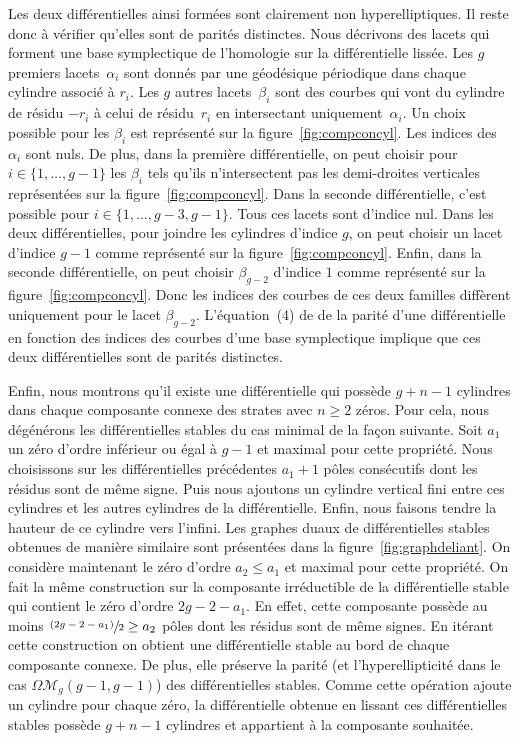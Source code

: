 \documentclass[11pt]{article}
\numberwithin{equation}{section}\renewcommand{\proofname}{Démonstration}
\let\mathcal\mathscr
\newcommand{\psfrac}[2]{\sfrac{(#1)}{#2}}
\newcommand{\omoduli}[1][g]{{\Omega\mathcal M}_{\!#1}}
\theoremstyle{definition}
\begin{document}
Les deux différentielles ainsi formées sont clairement non hyperelliptiques. Il reste donc à vérifier qu'elles sont de parités distinctes. Nous décrivons des lacets qui forment une base symplectique de l'homologie sur la différentielle lissée. Les $g$ premiers lacets~$\alpha_{i}$ sont donnés par une géodésique périodique dans chaque cylindre associé à $r_{i}$. Les $g$ autres lacets~$\beta_{i}$ sont des courbes qui vont du cylindre de résidu $-r_{i}$ à celui de résidu~$r_{i}$ en intersectant uniquement~$\alpha_{i}$. Un choix possible pour les $\beta_{i}$ est représenté sur la figure~\ref{fig:compconcyl}. Les indices des~$\alpha_{i}$ sont nuls. De plus, dans la première différentielle, on peut choisir pour $i\in\{1,\dots,g-1\}$ les $\beta_{i}$ tels qu'ils n'intersectent pas les demi-droites verticales représentées sur la figure~\ref{fig:compconcyl}. Dans la seconde différentielle, c'est possible pour $i\in\{ 1,\dots,g-3,g-1 \}$. Tous ces lacets sont d'indice nul. Dans les deux différentielles, pour joindre les cylindres d'indice $g$, on peut choisir un lacet d'indice $g-1$ comme représenté sur la figure~\ref{fig:compconcyl}. Enfin, dans la seconde différentielle, on peut choisir $\beta_{g-2}$ d'indice $1$ comme représenté sur la figure~\ref{fig:compconcyl}. Donc les indices des courbes de ces deux familles diffèrent uniquement pour le lacet $\beta_{g-2}$. L'équation~(4) de \cite{kozo} de la parité d'une différentielle en fonction des indices des courbes d'une base symplectique implique que ces deux différentielles sont de parités distinctes.

Enfin, nous montrons qu'il existe une différentielle qui possède $g+n-1$ cylindres dans chaque composante connexe des strates avec $n\geq2$ zéros. Pour cela, nous dégénérons les différentielles stables du cas minimal de la façon suivante. Soit $a_{1}$ un zéro d'ordre inférieur ou égal à $g-1$ et maximal pour cette propriété. Nous choisissons sur les différentielles précédentes $a_{1}+1$ pôles consécutifs dont les résidus sont de même signe. Puis nous ajoutons un cylindre vertical fini entre ces cylindres et les autres cylindres de la différentielle. Enfin, nous faisons tendre la hauteur de ce cylindre vers l'infini. Les graphes duaux de différentielles stables obtenues de manière similaire sont présentées dans la figure~\ref{fig:graphdeliant}. On considère maintenant le zéro d'ordre $a_{2}\leq a_{1}$ et maximal pour cette propriété. On fait la même construction sur la composante irréductible de la différentielle stable qui contient le zéro d'ordre $2g-2-a_{1}$. En effet, cette composante possède au moins $\psfrac{2g-2-a_{1}}{2} \geq a_{2}$ pôles dont les résidus sont de même signes. En itérant cette construction on obtient une différentielle stable au bord de chaque composante connexe. De plus, elle préserve la parité (et l'hyperellipticité dans le cas $\omoduli(g-1,g-1)$) des différentielles stables. Comme cette opération ajoute un cylindre pour chaque zéro, la différentielle obtenue en lissant ces différentielles stables possède $g+n-1$ cylindres et appartient à la composante souhaitée.
\end{document}
